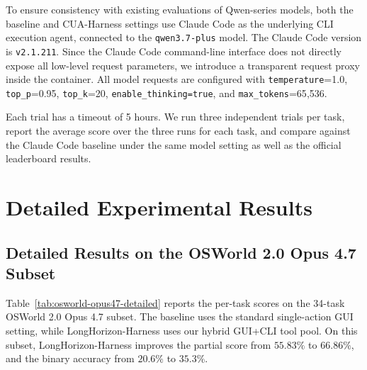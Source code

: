 To ensure consistency with existing evaluations of Qwen-series models, both the baseline and CUA-Harness settings use Claude Code as the underlying CLI execution agent, connected to the \texttt{qwen3.7-plus} model. The Claude Code version is \texttt{v2.1.211}. Since the Claude Code command-line interface does not directly expose all low-level request parameters, we introduce a transparent request proxy inside the container. All model requests are configured with \texttt{temperature}=1.0, \texttt{top\_p}=0.95, \texttt{top\_k}=20, \texttt{enable\_thinking=true}, and \texttt{max\_tokens}=65{,}536.

Each trial has a timeout of 5 hours. We run three independent trials per task, report the average score over the three runs for each task, and compare against the Claude Code baseline under the same model setting as well as the official leaderboard results.

\section{Detailed Experimental Results}
\subsection{Detailed Results on the OSWorld 2.0 Opus 4.7 Subset}

Table~\ref{tab:osworld-opus47-detailed} reports the per-task scores on the 34-task OSWorld 2.0 Opus 4.7 subset. The baseline uses the standard single-action GUI setting, while LongHorizon-Harness uses our hybrid GUI+CLI tool pool. On this subset, LongHorizon-Harness improves the partial score from $55.83\%$ to $66.86\%$, and the binary accuracy from $20.6\%$ to $35.3\%$.

